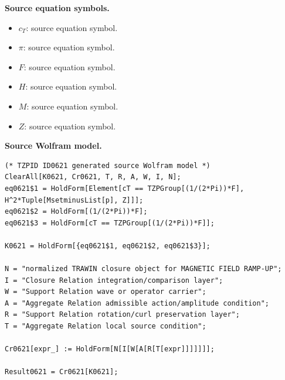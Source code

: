 \begin{minipage}[t]{0.49\linewidth}
\begingroup
\small
\raggedright
\textbf{Source equation symbols.}\par
\begin{itemize}[leftmargin=1.35em,itemsep=1pt,topsep=1pt,parsep=0pt]
    \item $c_T$: source equation symbol.
    \item $\pi$: source equation symbol.
    \item $F$: source equation symbol.
    \item $H$: source equation symbol.
    \item $M$: source equation symbol.
    \item $Z$: source equation symbol.
\end{itemize}
\endgroup
\end{minipage}\hfill
\begin{minipage}[t]{0.47\linewidth}
\begingroup
\scriptsize
\raggedright
\textbf{Source Wolfram model.}\par
\begin{Verbatim}[fontsize=\tiny,breaklines=true,breakanywhere=true]
(* TZPID ID0621 generated source Wolfram model *)
ClearAll[K0621, Cr0621, T, R, A, W, I, N];
eq0621$1 = HoldForm[Element[cT == TZPGroup[(1/(2*Pi))*F], H^2*Tuple[MsetminusList[p], Z]]];
eq0621$2 = HoldForm[(1/(2*Pi))*F];
eq0621$3 = HoldForm[cT == TZPGroup[(1/(2*Pi))*F]];

K0621 = HoldForm[{eq0621$1, eq0621$2, eq0621$3}];

N = "normalized TRAWIN closure object for MAGNETIC FIELD RAMP-UP";
I = "Closure Relation integration/comparison layer";
W = "Support Relation wave or operator carrier";
A = "Aggregate Relation admissible action/amplitude condition";
R = "Support Relation rotation/curl preservation layer";
T = "Aggregate Relation local source condition";

Cr0621[expr_] := HoldForm[N[I[W[A[R[T[expr]]]]]]];

Result0621 = Cr0621[K0621];
\end{Verbatim}
\endgroup
\end{minipage}

